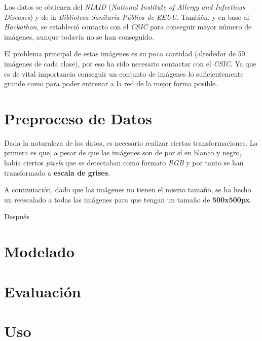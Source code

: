 \documentclass{uc3mpracticas}
\begin{document}
  \vspace{5mm}

  Los datos se obtienen del \textit{NIAID} (\textit{National Institute of Allergy and Infectious Diseases}) y de la \textit{Biblioteca Sanitaria Pública de EEUU}. También, y en base al \textit{Hackathon}, se estableció contacto con el \textit{CSIC} para conseguir mayor número de imágenes, aunque todavía no se han conseguido.

  \vspace{4mm}

  El problema principal de estas imágenes es su poca cantidad (alrededor de 50 imágenes de cada clase), por eso ha sido necesario contactar con el \textit{CSIC}. Ya que es de vital importancia conseguir un conjunto de imágenes lo suficientemente grande como para poder entrenar a la red de la mejor forma posible.

  \section{Preproceso de Datos}

  Dada la naturaleza de los datos, es necesario realizar ciertas transformaciones. La primera es que, a pesar de que las imágenes son de por sí en blanco y negro, había ciertos \textit{pixels} que se detectaban como formato \textit{RGB} y por tanto se han transformado a \textbf{escala de grises}.

  \vspace{2mm}

  A continuación, dado que las imágenes no tienen el mismo tamaño, se ha hecho un reescalado a todas las imágenes para que tengan un tamaño de \textbf{500x500px}.

  \vspace{4mm}

  Después


  \section{Modelado}

  \section{Evaluación}

  \section{Uso}
\end{document}
